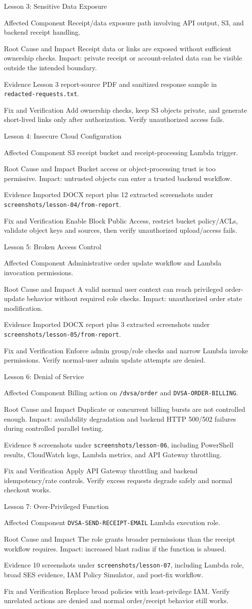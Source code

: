 \documentclass[aspectratio=169,11pt]{beamer}
\newcommand{\lessonframe}[5]{
\begin{frame}{#1}
  \small
  \begin{block}{Affected Component}
    #2
  \end{block}
  \begin{block}{Root Cause and Impact}
    #3
  \end{block}
  \begin{block}{Evidence}
    #4
  \end{block}
  \begin{block}{Fix and Verification}
    #5
  \end{block}
\end{frame}
}
\begin{document}
\lessonframe
{Lesson 3: Sensitive Data Exposure}
{Receipt/data exposure path involving API output, S3, and backend receipt handling.}
{Receipt data or links are exposed without sufficient ownership checks. Impact: private receipt or account-related data can be visible outside the intended boundary.}
{Lesson 3 report-source PDF and sanitized response sample in \texttt{redacted-requests.txt}.}
{Add ownership checks, keep S3 objects private, and generate short-lived links only after authorization. Verify unauthorized access fails.}

\lessonframe
{Lesson 4: Insecure Cloud Configuration}
{S3 receipt bucket and receipt-processing Lambda trigger.}
{Bucket access or object-processing trust is too permissive. Impact: untrusted objects can enter a trusted backend workflow.}
{Imported DOCX report plus 12 extracted screenshots under \texttt{screenshots/lesson-04/from-report}.}
{Enable Block Public Access, restrict bucket policy/ACLs, validate object keys and sources, then verify unauthorized upload/access fails.}

\lessonframe
{Lesson 5: Broken Access Control}
{Administrative order update workflow and Lambda invocation permissions.}
{A valid normal user context can reach privileged order-update behavior without required role checks. Impact: unauthorized order state modification.}
{Imported DOCX report plus 3 extracted screenshots under \texttt{screenshots/lesson-05/from-report}.}
{Enforce admin group/role checks and narrow Lambda invoke permissions. Verify normal-user admin update attempts are denied.}

\lessonframe
{Lesson 6: Denial of Service}
{Billing action on \texttt{/dvsa/order} and \texttt{DVSA-ORDER-BILLING}.}
{Duplicate or concurrent billing bursts are not controlled enough. Impact: availability degradation and backend HTTP 500/502 failures during controlled parallel testing.}
{8 screenshots under \texttt{screenshots/lesson-06}, including PowerShell results, CloudWatch logs, Lambda metrics, and API Gateway throttling.}
{Apply API Gateway throttling and backend idempotency/rate controls. Verify excess requests degrade safely and normal checkout works.}

\lessonframe
{Lesson 7: Over-Privileged Function}
{\texttt{DVSA-SEND-RECEIPT-EMAIL} Lambda execution role.}
{The role grants broader permissions than the receipt workflow requires. Impact: increased blast radius if the function is abused.}
{10 screenshots under \texttt{screenshots/lesson-07}, including Lambda role, broad SES evidence, IAM Policy Simulator, and post-fix workflow.}
{Replace broad policies with least-privilege IAM. Verify unrelated actions are denied and normal order/receipt behavior still works.}
\end{document}
